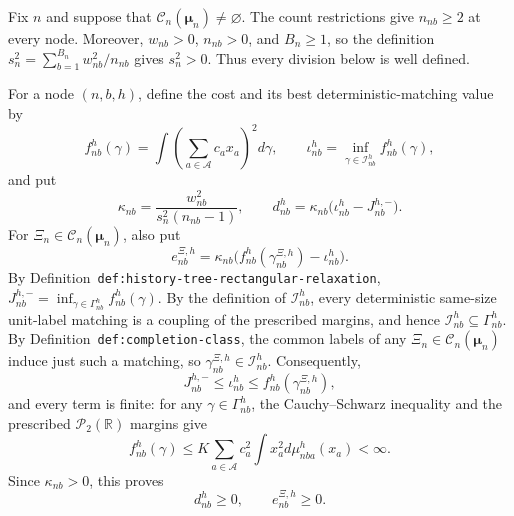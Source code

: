 Fix \(n\) and suppose that \(\mathcal C_n(\boldsymbol\mu_n)\ne\varnothing\).  The count restrictions give \(n_{nb}\ge2\) at every node.  Moreover, \(w_{nb}>0\), \(n_{nb}>0\), and \(B_n\ge1\), so the definition \(s_n^2=\sum_{b=1}^{B_n}w_{nb}^2/n_{nb}\) gives \(s_n^2>0\).  Thus every division below is well defined.

For a node \((n,b,h)\), define the cost and its best deterministic-matching value by
\[
 f_{nb}^{h}(\gamma)=\int\left(\sum_{a\in\mathcal A}c_ax_a\right)^2d\gamma,
 \qquad
 \iota_{nb}^{h}=\inf_{\gamma\in\mathcal I_{nb}^{h}}f_{nb}^{h}(\gamma),
\]
and put
\[
 \kappa_{nb}=\frac{w_{nb}^2}{s_n^2(n_{nb}-1)},\qquad
 d_{nb}^{h}=\kappa_{nb}\bigl(\iota_{nb}^{h}-J_{nb}^{h,-}\bigr).
\]
For \(\Xi_n\in\mathcal C_n(\boldsymbol\mu_n)\), also put
\[
 e_{nb}^{\Xi,h}=\kappa_{nb}
 \bigl(f_{nb}^{h}(\gamma_{nb}^{\Xi,h})-\iota_{nb}^{h}\bigr).
\]
By Definition~\texttt{def:history-tree-rectangular-relaxation},
\(J_{nb}^{h,-}=\inf_{\gamma\in\Gamma_{nb}^{h}}f_{nb}^{h}(\gamma)\).  By the definition of \(\mathcal I_{nb}^{h}\), every deterministic same-size unit-label matching is a coupling of the prescribed margins, and hence
\(\mathcal I_{nb}^{h}\subseteq\Gamma_{nb}^{h}\).  By Definition~\texttt{def:completion-class}, the common labels of any \(\Xi_n\in\mathcal C_n(\boldsymbol\mu_n)\) induce just such a matching, so
\(\gamma_{nb}^{\Xi,h}\in\mathcal I_{nb}^{h}\).  Consequently,
\[
 J_{nb}^{h,-}\le \iota_{nb}^{h}
 \le f_{nb}^{h}(\gamma_{nb}^{\Xi,h}),
\]
and every term is finite: for any \(\gamma\in\Gamma_{nb}^{h}\), the Cauchy--Schwarz inequality and the prescribed \(\mathcal P_2(\mathbb R)\) margins give
\[
 f_{nb}^{h}(\gamma)
 \le K\sum_{a\in\mathcal A}c_a^2\int x_a^2d\mu_{nba}^{h}(x_a)<\infty. 
\]
Since \(\kappa_{nb}>0\), this proves
\[
 d_{nb}^{h}\ge0,
 \qquad
 e_{nb}^{\Xi,h}\ge0. \tag{1}
\]

